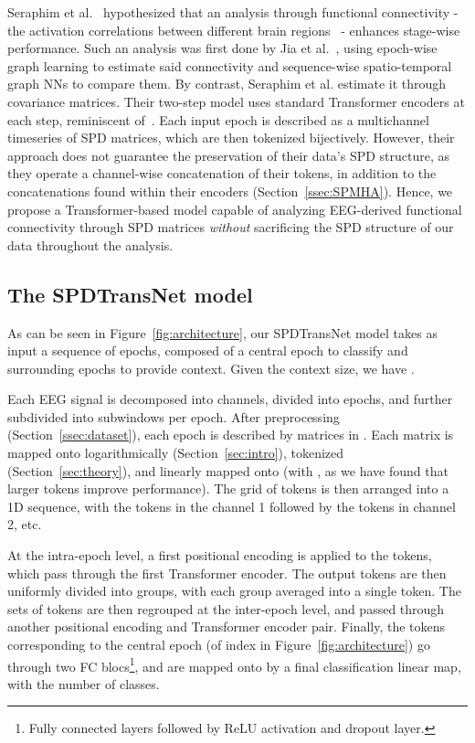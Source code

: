 \documentclass{article}
\begin{document}
Seraphim et al.~\cite{CAIP_article} hypothesized that an analysis through functional connectivity - the activation correlations between different brain regions~\cite{EICKHOFF2015187} - enhances stage-wise performance. Such an analysis was first done by Jia et al.~\cite{jia2020graphsleepnet}, using epoch-wise graph learning to estimate said connectivity and sequence-wise spatio-temporal graph NNs to compare them.
By contrast, Seraphim et al. estimate it through covariance matrices.
Their two-step model uses standard Transformer encoders at each step, reminiscent of~\cite{phan2022sleeptransformer}. Each input epoch is described as a multichannel timeseries of SPD matrices, which are then tokenized bijectively.
However, their approach does not guarantee the preservation of their data's SPD structure, as they operate a channel-wise concatenation of their tokens, in addition to the concatenations found within their encoders (Section~\ref{ssec:SPMHA}).
Hence, we propose a Transformer-based model capable of analyzing EEG-derived functional connectivity through SPD matrices \textit{without} sacrificing the SPD structure of our data throughout the analysis.

\subsection{The SPDTransNet model}
\label{ssec:model}

As can be seen in Figure~\ref{fig:architecture}, our SPDTransNet model takes as input a sequence of  epochs, composed of a central epoch to classify and surrounding epochs to provide context.
Given  the context size, we have .

Each EEG signal is decomposed into  channels, divided into epochs, and further subdivided into  subwindows per epoch. After preprocessing (Section~\ref{ssec:dataset}), each epoch is described by  matrices in .
Each matrix is mapped onto  logarithmically (Section~\ref{sec:intro}), tokenized (Section~\ref{sec:theory}), and linearly mapped onto  (with , as we have found that larger tokens improve performance).
The  grid of tokens is then arranged into a 1D sequence, with the  tokens in the channel 1 followed by the  tokens in channel 2, etc.

At the intra-epoch level, a first positional encoding is applied to the tokens, which pass through the first Transformer encoder. The  output tokens are then uniformly divided into  groups, with each group averaged into a single token.
The  sets of  tokens are then regrouped at the inter-epoch level, and passed through another positional encoding and Transformer encoder pair.
Finally, the  tokens corresponding to the central epoch (of index  in Figure~\ref{fig:architecture}) go through two FC blocs\footnote{Fully connected layers followed by ReLU activation and dropout layer.}, and are mapped onto  by a final classification linear map, with  the number of classes.
\end{document}
